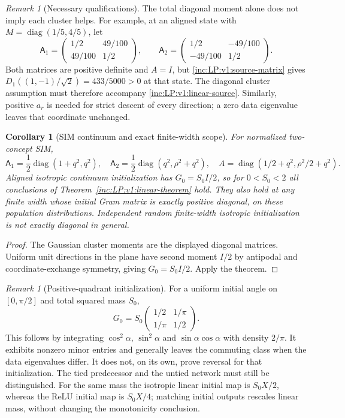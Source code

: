 \documentclass[11pt]{article}
\numberwithin{equation}{section}
\newtheorem{corollary}[theorem]{Corollary}
\theoremstyle{remark}\newtheorem{remark}[theorem]{Remark}
\DeclareMathOperator{\diag}{diag}
\begin{document}
\begin{remark}[Necessary qualifications]
The total diagonal moment alone does not imply each cluster helps. For
example, at an aligned state with $M=\diag(1/5,4/5)$, let
\[
 \mathsf A_1=\begin{pmatrix}1/2&49/100\\49/100&1/2\end{pmatrix},\qquad
 \mathsf A_2=\begin{pmatrix}1/2&-49/100\\-49/100&1/2\end{pmatrix}.
\]
Both matrices are positive definite and $A=I$, but
\eqref{inc:LP:v1:source-matrix} gives
$D_1((1,-1)/\sqrt2)=433/5000>0$ at that state. The diagonal cluster
assumption must therefore accompany \eqref{inc:LP:v1:linear-source}.
Similarly, positive $a_r$ is needed for strict descent of every direction;
a zero data eigenvalue leaves that coordinate unchanged.
\end{remark}

\begin{corollary}[SIM continuum and exact finite-width scope]
\label{inc:LP:v1:linear-SIM}
For normalized two-concept SIM,
\[
 \mathsf A_1=\frac12\diag(1+q^2,q^2),\quad
 \mathsf A_2=\frac12\diag(q^2,\rho^2+q^2),\quad
 A=\diag(1/2+q^2,\rho^2/2+q^2).
\]
Aligned isotropic continuum initialization has $G_0=S_0I/2$, so for
$0<S_0<2$ all conclusions of Theorem~\ref{inc:LP:v1:linear-theorem} hold.
They also hold at any finite width whose initial Gram matrix is exactly
positive diagonal, on these population distributions. Independent random
finite-width isotropic initialization is not exactly diagonal in general.
\end{corollary}
\begin{proof}
The Gaussian cluster moments are the displayed diagonal matrices. Uniform
unit directions in the plane have second moment $I/2$ by antipodal and
coordinate-exchange symmetry, giving $G_0=S_0I/2$. Apply the theorem.
\end{proof}

\begin{remark}[Positive-quadrant initialization]
For a uniform initial angle on $[0,\pi/2]$ and total squared mass $S_0$,
\[
 G_0=S_0\begin{pmatrix}1/2&1/\pi\\1/\pi&1/2\end{pmatrix}.
\]
This follows by integrating $\cos^2\alpha$, $\sin^2\alpha$ and
$\sin\alpha\cos\alpha$ with density $2/\pi$. It exhibits nonzero minor
entries and generally leaves the commuting class when the data eigenvalues
differ. It does not, on its own, prove reversal for that initialization.
The tied predecessor and the untied network must still be distinguished.
For the same mass the isotropic linear initial map is $S_0X/2$, whereas the
ReLU initial map is $S_0X/4$; matching initial outputs rescales linear mass,
without changing the monotonicity conclusion.
\end{remark}
\end{document}

